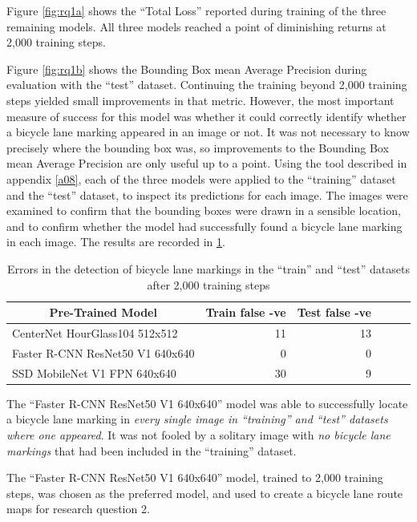 \documentclass[11pt,twoside]{report}
\begin{document}
Figure \ref{fig:rq1a} shows the ``Total Loss'' reported during training of the three remaining models.  All three models reached a point of diminishing returns at 2,000 training steps.

Figure \ref{fig:rq1b} shows the Bounding Box mean Average Precision during evaluation with the ``test'' dataset.  Continuing the training beyond 2,000 training steps yielded small improvements in that metric.  However, the most important measure of success for this model was whether it could correctly identify whether a bicycle lane marking appeared in an image or not.  It was not necessary to know precisely where the bounding box was, so improvements to the Bounding Box mean Average Precision are only useful up to a point.  Using the tool described in appendix \ref{a08}, each of the three models were applied to the ``training'' dataset and the ``test'' dataset, to inspect its predictions for each image.  The images were examined to confirm that the bounding boxes were drawn in a sensible location, and to confirm whether the model had successfully found a bicycle lane marking in each image.  The results are recorded in \ref{table2}.

\begin{table}[h]
\centering
\begin{tabular}{|l|r|r|r|r|r|}
\hline
\multicolumn{1}{|c|}{\bfseries Pre-Trained Model} & \textbf{Train false -ve} & \textbf{Test false -ve}\\
\hline
CenterNet HourGlass104 512x512 & 11 & 13 \\
Faster R-CNN ResNet50 V1 640x640 & 0 & 0 \\
SSD MobileNet V1 FPN 640x640 & 30 & 9 \\
\hline
\end{tabular}
\caption{Errors in the detection of bicycle lane markings in the ``train'' and ``test'' datasets after 2,000 training steps}
\label{table2}
\end{table}

The ``Faster R-CNN ResNet50 V1 640x640'' model was able to successfully locate a bicycle lane marking in \textit{every single image in ``training'' and ``test'' datasets where one appeared}.  It was not fooled by a solitary image with \textit{no bicycle lane markings} that had been included in the ``training'' dataset.

The ``Faster R-CNN ResNet50 V1 640x640'' model, trained to 2,000 training steps, was chosen as the preferred model, and used to create a bicycle lane route maps for research question 2.
\end{document}
